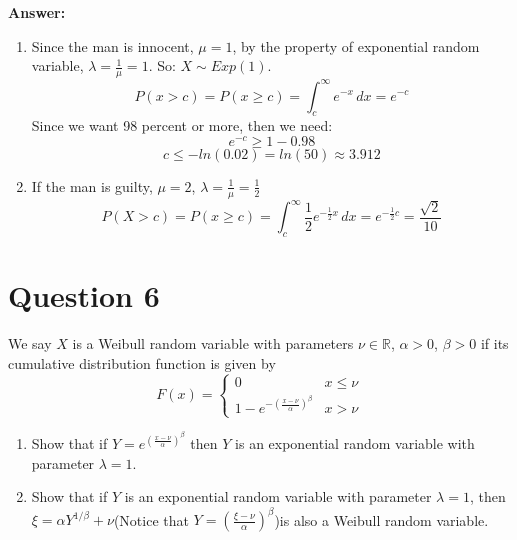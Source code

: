 \documentclass[hidelinks]{article}
\begin{document}
\textbf{Answer:}
\begin{enumerate}
    \item Since the man is innocent, $\mu = 1$, by the property of exponential random variable, $\lambda = \frac{1}{\mu} = 1$. So: $X \sim Exp(1)$.
    $$P(x > c) = P(x \geq c) = \int^\infty_c e^{-x}\, dx = e^{-c}$$
    Since we want 98 percent or more, then we need:
    $$ e^{-c} \geq 1 - 0.98$$
    $$ c \leq -ln(0.02) = ln(50) \approx 3.912$$
    \item If the man is guilty, $\mu = 2$, $\lambda = \frac{1}{\mu} = \frac{1}{2}$
    $$P(X > c) = P(x \geq c) = \int^\infty_c \frac{1}{2}e^{-\frac{1}{2}x}\, dx = e^{-\frac{1}{2}c} = \frac{\sqrt{2}}{10}$$
    
\end{enumerate}






\section{Question 6}
We say $X$ is a Weibull random variable with parameters $\nu \in \mathbb{R}$, $\alpha > 0$, $\beta > 0$ if its cumulative distribution function is given by
\[
F(x) = 
\begin{cases}
    0 & x \leq \nu \\
    1 - e^{-(\frac{x - \nu}{\alpha})^{\beta}} & x > \nu
\end{cases}
\]
\begin{enumerate}
    \item  Show that if $Y = e^{(\frac{x - \nu}{\alpha})^{\beta}}$ then $Y$ is an exponential random variable with parameter $\lambda = 1.$
    \item  Show that if $Y$ is an exponential random variable with parameter $\lambda = 1$, then $\xi = \alpha Y^{1/\beta} + \nu$(Notice that $Y = (\frac{\xi - \nu}{\alpha})^{\beta}$)is also a Weibull random variable.
\end{enumerate}
\end{document}
